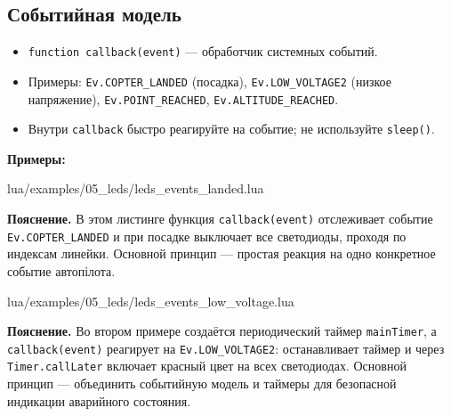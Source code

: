 \subsection{Событийная модель}
\begin{itemize}
  \item \verb|function callback(event)| — обработчик системных событий.
  \item Примеры: \verb|Ev.COPTER_LANDED| (посадка), \verb|Ev.LOW_VOLTAGE2| (низкое напряжение), \verb|Ev.POINT_REACHED|, \verb|Ev.ALTITUDE_REACHED|.
  \item Внутри \verb|callback| быстро реагируйте на событие; не используйте \verb|sleep()|.
\end{itemize}
\textbf{Примеры:}
\begin{codefile}{lua/examples/05_leds/leds_events_landed.lua}
\end{codefile}
\textbf{Пояснение.} В этом листинге функция \verb|callback(event)| отслеживает событие \verb|Ev.COPTER_LANDED| и при посадке выключает все светодиоды, проходя по индексам линейки. Основной принцип — простая реакция на одно конкретное событие автопілота.
\begin{codefile}{lua/examples/05_leds/leds_events_low_voltage.lua}
\end{codefile}
\textbf{Пояснение.} Во втором примере создаётся периодический таймер \verb|mainTimer|, а \verb|callback(event)| реагирует на \verb|Ev.LOW_VOLTAGE2|: останавливает таймер и через \verb|Timer.callLater| включает красный цвет на всех светодиодах. Основной принцип — объединить событийную модель и таймеры для безопасной индикации аварийного состояния.
